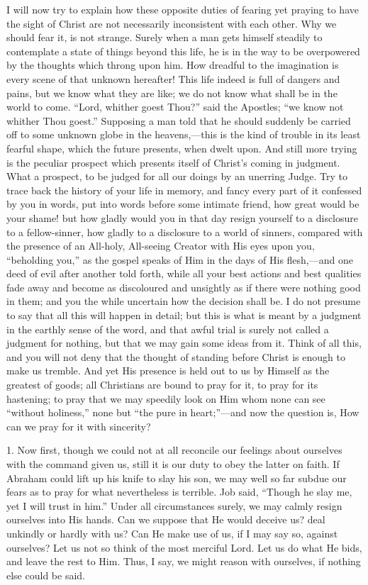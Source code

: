 I will now try to explain how these opposite duties of fearing yet
praying to have the sight of Christ are not necessarily inconsistent
with each other. Why we should fear it, is not strange. Surely when a
man gets himself steadily to contemplate a state of things beyond this
life, he is in the way to be overpowered by the thoughts which throng
upon him. How dreadful to the imagination is every scene of that
unknown hereafter! This life indeed is full of dangers and pains, but
we know what they are like; we do not know what shall be in the world
to come. ``Lord, whither goest Thou?'' said the Apostles;
``we know not whither Thou goest.'' Supposing a man told that
he should suddenly be carried off to some unknown globe in the
heavens,—this is the kind of trouble in its least fearful shape,
which the future presents, when dwelt upon. And still more trying is
the peculiar prospect which presents itself of Christ's coming in
judgment. What a prospect, to be judged for all our doings by an
unerring Judge. Try to trace back the history of your life in memory,
and fancy every part of it confessed by you in words, put into words
before some intimate friend, how great would be your shame! but how
gladly would you in that day resign yourself to a disclosure to a
fellow-sinner, how gladly to a disclosure to a world of sinners,
compared with the presence of an All-holy, All-seeing Creator with His
eyes upon you, ``beholding you,'' as the gospel speaks of Him
in the days of His flesh,—and one deed of evil after another told
forth, while all your best actions and best qualities fade away and
become as discoloured and unsightly as if there were nothing good in
them; and you the while uncertain how the decision shall be. I do not
presume to say that all this will happen in detail; but this is what
is meant by a judgment in the earthly sense of the word, and that
awful trial is surely not called a judgment for nothing, but that we
may gain some ideas from it. Think of all this, and you will not deny
that the thought of standing before Christ is enough to make us
tremble. And yet His presence is held out to us by Himself as the
greatest of goods; all Christians are bound to pray for it, to pray
for its hastening; to pray that we may speedily look on Him whom none
can see ``without holiness,'' none but ``the pure in
heart;''—and now the question is, How can we pray for it with
sincerity?

1. Now first, though we could not at all reconcile our feelings
about ourselves with the command given us, still it is our duty to
obey the latter on faith. If Abraham could lift up his knife to slay
his son, we may well so far subdue our fears as to pray for what
nevertheless is terrible. Job said, ``Though he slay me, yet I
will trust in him.'' Under all circumstances surely, we may calmly
resign ourselves into His hands. Can we suppose that He would deceive
us? deal unkindly or hardly with us? Can He make use of us, if I may
say so, against ourselves? Let us not so think of the most merciful
Lord. Let us do what He bids, and leave the rest to Him. Thus, I say,
we might reason with ourselves, if nothing else could be said.

